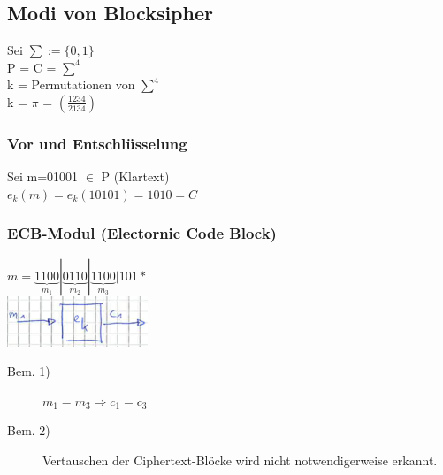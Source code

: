 \documentclass[10pt]{article}
\begin{document}
\subsection{Modi von Blocksipher}
Sei $\sum := \{0,1\}$ \\
P = C = $\sum^4$ \\
k = Permutationen von $\sum^4$ \\
k = $\pi$ = $(\frac{1 2 3 4}{2 1 3 4})$

\subsubsection*{Vor und Entschlüsselung}
Sei m=01001 $\in$ P (Klartext) \\
$e_k(m)=e_k(10101)=1010=C$

\subsubsection{ECB-Modul (Electornic Code Block)}
$m=\underbrace{1100}_{m_1}|\underbrace{0110}_{m_2} | \underbrace{1100}_{m_3} | 101*$ \\
\includegraphics[scale=0.5]{ECB-modus.png}
\begin{description}
	\item[Bem. 1)] $m_1=m_3\Rightarrow c_1=c_3$
	\item[Bem. 2)] Vertauschen der Ciphertext-Blöcke wird nicht notwendigerweise erkannt.
\end{description}
\end{document}
